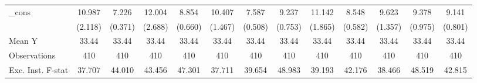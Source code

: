 {\begin{tabular}{l*{12}{c}}
\addlinespace
\_cons      &      10.987\sym{***}&       7.226\sym{***}&      12.004\sym{***}&       8.854\sym{***}&      10.407\sym{***}&       7.587\sym{***}&       9.237\sym{***}&      11.142\sym{***}&       8.548\sym{***}&       9.623\sym{***}&       9.378\sym{***}&       9.141\sym{***}\\
            &     (2.118)         &     (0.371)         &     (2.688)         &     (0.660)         &     (1.467)         &     (0.508)         &     (0.753)         &     (1.865)         &     (0.582)         &     (1.357)         &     (0.975)         &     (0.801)         \\
\midrule
Mean Y      &       33.44         &       33.44         &       33.44         &       33.44         &       33.44         &       33.44         &       33.44         &       33.44         &       33.44         &       33.44         &       33.44         &       33.44         \\
Observations&         410         &         410         &         410         &         410         &         410         &         410         &         410         &         410         &         410         &         410         &         410         &         410         \\
Exc. Inst. F-stat&      37.707         &      44.010         &      43.456         &      47.301         &      37.711         &      39.654         &      48.983         &      39.193         &      42.176         &      38.466         &      48.519         &      42.815         \\
\bottomrule
\end{tabular}
}
